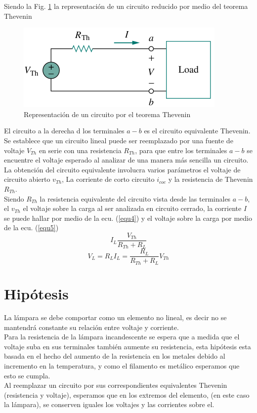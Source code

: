 \documentclass[twocolumn]{IEEEtran}
\begin{document}
\noindent
Siendo la Fig. \ref{fig2} la representación de un circuito reducido por medio del teorema Thevenin
\begin{figure}[H]
	\centering
		\includegraphics[scale=0.5]{th2.png}
	\caption{Representación de un circuito por el teorema Thevenin}
	\label{fig2}
\end{figure}
\noindent
El circuito a la derecha d los terminales $a - b$ es el circuito equivalente Thevenin.\\
Se establece que un circuito lineal puede ser reemplazado por una fuente de voltaje $V_{Th}$ en serie con una resistencia $R_{Th}$, para que entre los terminales $a - b$ se encuentre el voltaje esperado al analizar de una manera más sencilla un circuito. La obtención del circuito equivalente involucra varios parámetros el voltaje de circuito abierto $v_{Th}$, La corriente de corto circuito $i_{coc}$ y la resistencia de Thevenin $R_{Th}$.\\
Siendo $R_{Th}$ la resistencia equivalente del circuito vista desde las terminales $a - b$, el $v_{Th}$ el voltaje sobre la carga al ser analizada en circuito cerrado, la corriente $I$ se puede hallar por medio de la ecu. (\ref{equ4}) y el voltaje sobre la carga por medio de la ecu. (\ref{equ5})
\begin{equation}
 I_L\frac{V_{Th}}{R_{Th} + R_L}
 \label{equ4}
\end{equation}
\begin{equation}
 V_L = R_L I_L = \frac{R_L}{R_{Th} + R_L} V_{Th}
 \label{equ5}
\end{equation}

\section{Hipótesis}
\noindent
La lámpara se debe comportar como un elemento no lineal, es decir no se mantendrá constante su relación entre voltaje y corriente. \\
Para la resistencia de la lámpara incandescente se espera que a medida que el voltaje suba en sus terminales también aumente su resistencia, esta hipótesis esta basada  en el hecho del aumento de la resistencia en los metales debido al incremento en la temperatura, y como el filamento es metálico esperamos que esto se cumpla.\\
Al reemplazar un circuito por sus correspondientes equivalentes Thevenin (resistencia y voltaje), esperamos que en los extremos del  elemento, (en este caso la lámpara), se conserven iguales los voltajes y las corrientes sobre el.
\end{document}
